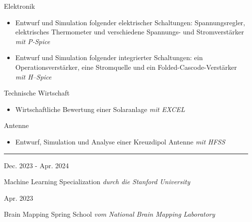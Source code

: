 \documentclass[a4paper,10pt]{article}
\newlength{\cvcolumngapwidth}
\newlength{\cvleftcolumnwidth}
\newlength{\cvrightcolumnwidth}
\newcommand{\cvsectionstyle}[1]{{\normalsize\cvsectionfont\textcolor{cvsectioncolor}{#1}}}
\newcommand{\cvtitlestyle}[1]{{\large\cvtitlefont\textcolor{cvtitlecolor}{#1}}}
\newcommand{\cvdurationstyle}[1]{{\small\cvdurationfont\textcolor{cvdurationcolor}{#1}}}
\newcommand{\cvheadingstyle}[1]{{\normalsize\cvheadingfont\textcolor{cvheadingcolor}{#1}}}
\newlength{\cvafteritemskipamount}
\newlength{\cvaftersectionskipamount}
\newlength{\cvaftertitleskipamount}
\newlength{\cvparskip}
\newcommand{\cvsection}[1]{
    \begin{minipage}[t]{\cvleftcolumnwidth}
        \raggedleft\cvsectionstyle{#1}
    \end{minipage}%
    \hspace{\cvcolumngapwidth}%
    \begin{minipage}[t]{\cvrightcolumnwidth}
        \textcolor{cvrulecolor}{\rule{\cvrightcolumnwidth}{0.3mm}}
    \end{minipage}

    \vspace{\cvaftersectionskipamount}
}
\newcommand{\cvitem}[2]{
    \begin{minipage}[t]{\cvleftcolumnwidth}
        \raggedleft #1
    \end{minipage}%
    \hspace{\cvcolumngapwidth}%
    \begin{minipage}[t]{\cvrightcolumnwidth}
        \setlength{\parskip}{\cvparskip} #2
    \end{minipage}

    \vspace{\cvafteritemskipamount}
}
\newcommand{\cvtitle}[1]{
    \cvtitlestyle{#1}

    \vspace{\cvaftertitleskipamount}
    \vspace{-\cvparskip}
}
\begin{document}
\cvitem{
    \cvheadingstyle{Elektronik}
}{
    \begin{itemize}[leftmargin=*]
        \item Entwurf und Simulation folgender elektrischer Schaltungen: Spannungsregler, elektrisches Thermometer und verschiedene Spannungs- und Stromverstärker \small{\textit{mit P-Spice}}
        \item Entwurf und Simulation folgender integrierter Schaltungen: ein Operationsverstärker, eine Stromquelle und ein Folded-Cascode-Verstärker \small{\textit{mit H–Spice}}
    \end{itemize}
}
\cvitem{
    \cvheadingstyle{Technische Wirtschaft}
}{
    \begin{itemize}[leftmargin=*]
        \item Wirtschaftliche Bewertung einer Solaranlage \small{\textit{mit EXCEL}}
    \end{itemize}
}
\cvitem{
    \cvheadingstyle{Antenne}
}{
    \begin{itemize}[leftmargin=*]
        \item Entwurf, Simulation und Analyse einer Kreuzdipol Antenne \small{\textit{mit HFSS}}
    \end{itemize}
}

\cvsection{ONLINE-KURSE}
\cvitem{
    \cvdurationstyle{Dec. 2023 - Apr. 2024}
}{
    \cvtitle{{Machine Learning Specialization} \textit{\small{durch die Stanford University}}}
}
\vspace{-4mm}
\cvitem{
    \cvdurationstyle{Apr. 2023}
}{
    \cvtitle{{Brain Mapping Spring School} \textit{\small{vom National Brain Mapping Laboratory}}}
}
\end{document}
